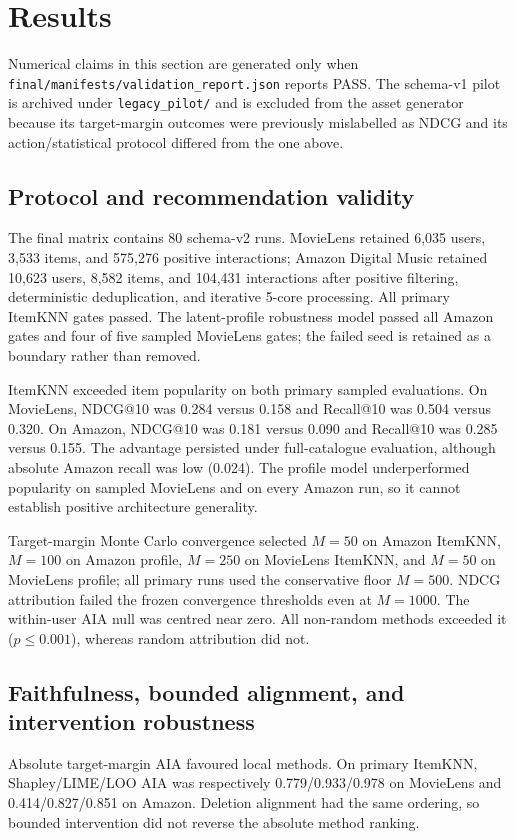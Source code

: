 \documentclass[pdflatex,sn-basic]{sn-jnl}
\begin{document}
\section{Results}
Numerical claims in this section are generated only when \texttt{final/manifests/validation\_report.json} reports PASS. The schema-v1 pilot is archived under \texttt{legacy\_pilot/} and is excluded from the asset generator because its target-margin outcomes were previously mislabelled as NDCG and its action/statistical protocol differed from the one above.

\subsection{Protocol and recommendation validity}
The final matrix contains 80 schema-v2 runs. MovieLens retained 6,035 users, 3,533 items, and 575,276 positive interactions; Amazon Digital Music retained 10,623 users, 8,582 items, and 104,431 interactions after positive filtering, deterministic deduplication, and iterative 5-core processing. All primary ItemKNN gates passed. The latent-profile robustness model passed all Amazon gates and four of five sampled MovieLens gates; the failed seed is retained as a boundary rather than removed.

ItemKNN exceeded item popularity on both primary sampled evaluations. On MovieLens, NDCG@10 was 0.284 versus 0.158 and Recall@10 was 0.504 versus 0.320. On Amazon, NDCG@10 was 0.181 versus 0.090 and Recall@10 was 0.285 versus 0.155. The advantage persisted under full-catalogue evaluation, although absolute Amazon recall was low (0.024). The profile model underperformed popularity on sampled MovieLens and on every Amazon run, so it cannot establish positive architecture generality.

Target-margin Monte Carlo convergence selected $M=50$ on Amazon ItemKNN, $M=100$ on Amazon profile, $M=250$ on MovieLens ItemKNN, and $M=50$ on MovieLens profile; all primary runs used the conservative floor $M=500$. NDCG attribution failed the frozen convergence thresholds even at $M=1000$. The within-user AIA null was centred near zero. All non-random methods exceeded it ($p\leq0.001$), whereas random attribution did not.

\subsection{Faithfulness, bounded alignment, and intervention robustness}
Absolute target-margin AIA favoured local methods. On primary ItemKNN, Shapley/LIME/LOO AIA was respectively 0.779/0.933/0.978 on MovieLens and 0.414/0.827/0.851 on Amazon. Deletion alignment had the same ordering, so bounded intervention did not reverse the absolute method ranking.
\end{document}
